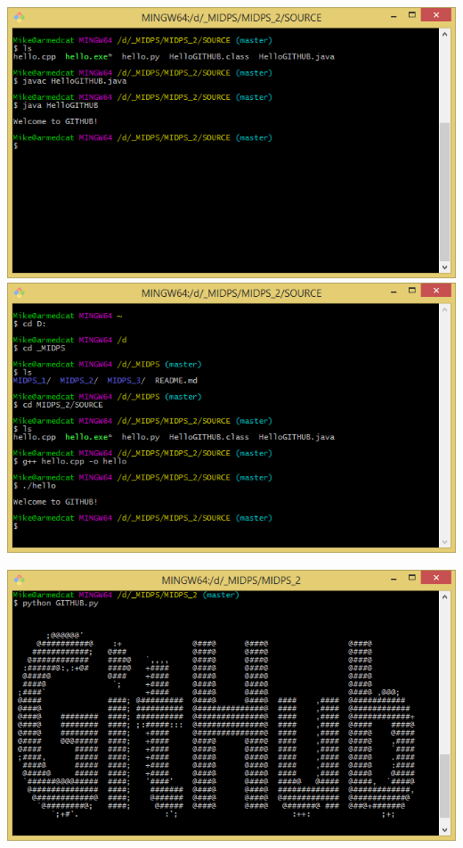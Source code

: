\begin{center}
\includegraphics[scale=0.5]{images/java}
\includegraphics[scale=0.5]{images/cpp}\\
\end{center}
\begin{center}
\includegraphics[scale=1]{images/Python}
\end{center}

